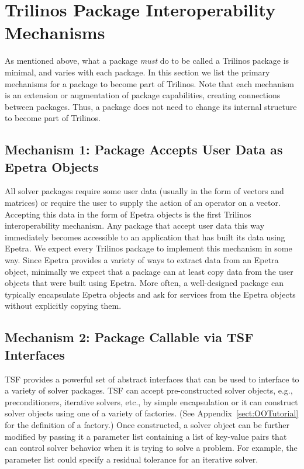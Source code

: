 \documentclass[12pt,relax]{SANDreport}
\begin{document}
\section{Trilinos Package Interoperability Mechanisms}
\label{sect:PackageDefinition}
As mentioned above, what a package {\it must} do to be called a Trilinos
package is minimal, and varies with each package.  In this section we
list the primary mechanisms for a package to become part of Trilinos.
Note that each mechanism is an extension or augmentation of package
capabilities, creating connections between packages.  Thus, a package does 
not need to change its internal structure to become part of Trilinos.

\subsection{Mechanism 1: Package Accepts User Data as Epetra Objects}
All solver packages require some user data (usually in the form of
vectors and matrices) or require the user to supply the action of an
operator on a vector.  Accepting this data in the form of Epetra
objects is the first Trilinos interoperability mechanism.  Any package
that accept user data this way immediately becomes accessible to an
application that has built its data using Epetra.  We expect every
Trilinos package to implement this mechanism in some way.  Since
Epetra provides a variety of ways to extract data from an Epetra
object, minimally we expect that a package can at least copy data from
the user objects that were built using Epetra.  More often, a well-designed
package can typically encapsulate Epetra objects and ask for services from
the Epetra objects without explicitly copying them.

\subsection{Mechanism 2: Package Callable via TSF Interfaces}
TSF provides a powerful set of abstract interfaces that can be used to
interface to a variety of solver packages.  TSF can accept
pre-constructed solver objects, e.g., preconditioners, iterative
solvers, etc., by simple encapsulation or it can
construct solver objects using one of a variety of factories.  (See
Appendix~\ref{sect:OOTutorial} for the definition of a factory.)  Once
constructed, a solver object can be further modified by passing it a
parameter list containing a list of key-value pairs that can control
solver behavior when it is trying to solve a problem.  For example,
the parameter list could specify a residual tolerance for an iterative solver.
\end{document}
